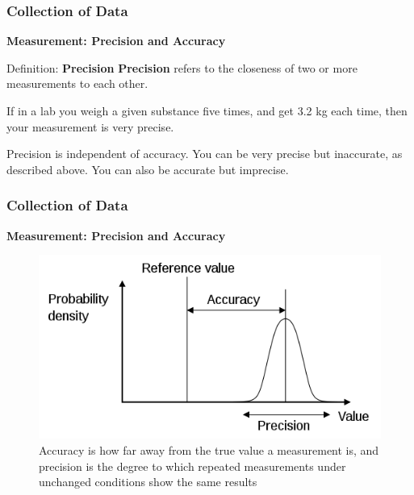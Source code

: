 \documentclass{beamer}
\begin{document}

\begin{frame}
\frametitle{Collection of Data}
\textbf{Measurement: Precision and Accuracy}\\
\vspace{0.5cm}
\begin{block}{Definition: \textbf{Precision}}
\textbf{Precision} refers to the closeness of two or more measurements to each other.
\end{block}
\vspace{0.5cm}
\begin{example}
If in a lab you weigh a given substance five times, and get 3.2 kg each time, then your measurement is very precise.
\end{example}
\vspace{0.5cm}
Precision is independent of accuracy. You can be very precise but inaccurate, as described above. You can also be accurate but imprecise.
\end{frame}


\begin{frame}
\frametitle{Collection of Data}
\textbf{Measurement: Precision and Accuracy}\\
\vspace{0.5cm}
\begin{figure}
\includegraphics[scale=0.5]{accuracy_and_precision}
\caption{Accuracy is how far away from the true value a measurement is, and precision is the degree to which repeated measurements under unchanged conditions show the same results}
\end{figure}
\end{frame}

\end{document}
